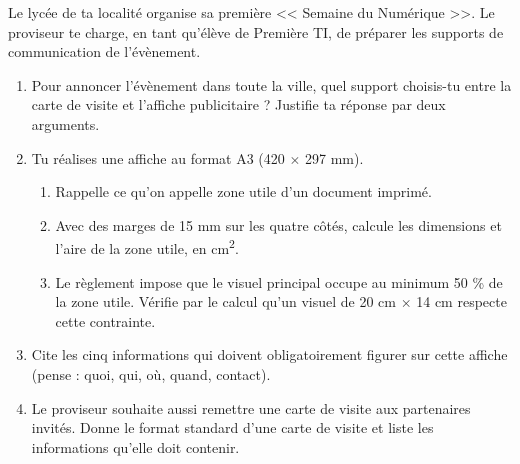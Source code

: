 \documentclass[11pt]{article}
\begin{document}
\begin{exercice}
Le lycée de ta localité organise sa première << Semaine du Numérique >>. Le proviseur te charge, en tant qu'élève de Première TI, de préparer les supports de communication de l'évènement.

\begin{enumerate}
\item Pour annoncer l'évènement dans toute la ville, quel support choisis-tu entre la carte de visite et l'affiche publicitaire ? Justifie ta réponse par deux arguments.
\item Tu réalises une affiche au format A3 (420 $\times$ 297 mm).
\begin{enumerate}
\item Rappelle ce qu'on appelle zone utile d'un document imprimé.
\item Avec des marges de 15 mm sur les quatre côtés, calcule les dimensions et l'aire de la zone utile, en cm\textsuperscript{2}.
\item Le règlement impose que le visuel principal occupe au minimum 50 \% de la zone utile. Vérifie par le calcul qu'un visuel de 20 cm $\times$ 14 cm respecte cette contrainte.
\end{enumerate}
\item Cite les cinq informations qui doivent obligatoirement figurer sur cette affiche (pense : quoi, qui, où, quand, contact).
\item Le proviseur souhaite aussi remettre une carte de visite aux partenaires invités. Donne le format standard d'une carte de visite et liste les informations qu'elle doit contenir.
\end{enumerate}
\end{exercice}
\end{document}
